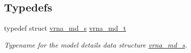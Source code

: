 \subsection*{Typedefs}
\begin{DoxyCompactItemize}
\item 
\mbox{\label{group__model__details_ga1f8a10e12a0a1915f2a4eff0b28ea17c}} 
typedef struct \hyperlink{group__model__details_structvrna__md__s}{vrna\+\_\+md\+\_\+s} \hyperlink{group__model__details_ga1f8a10e12a0a1915f2a4eff0b28ea17c}{vrna\+\_\+md\+\_\+t}
\begin{DoxyCompactList}\small\item\em Typename for the model details data structure \hyperlink{group__model__details_structvrna__md__s}{vrna\+\_\+md\+\_\+s}. \end{DoxyCompactList}\end{DoxyCompactItemize}
